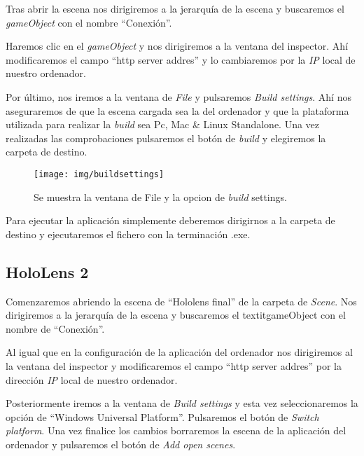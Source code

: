 Tras abrir la escena nos dirigiremos a la jerarquía de la escena y buscaremos el \textit{gameObject} con el nombre “Conexión”.


Haremos clic en el \textit{gameObject} y nos dirigiremos a la ventana del inspector. Ahí modificaremos el campo “http server addres” y lo cambiaremos por la \textit{IP} local de nuestro ordenador.


Por último, nos iremos a la ventana de \textit{File} y pulsaremos \textit{Build settings}. Ahí nos aseguraremos de que la escena cargada sea la del ordenador y que la plataforma utilizada para realizar la \textit{build} sea Pc, Mac \& Linux Standalone. Una vez realizadas las comprobaciones pulsaremos el botón de \textit{build} y elegiremos la carpeta de destino.

\begin{figure}
\centering
\texttt{[image: img/buildsettings]}
\caption{Se muestra la ventana de File y la opcion de \textit{build} settings.}
\end{figure}


Para ejecutar la aplicación simplemente deberemos dirigirnos a la carpeta de destino y ejecutaremos el fichero con la terminación .exe.

\subsection{HoloLens 2}

Comenzaremos abriendo la escena de “Hololens final” de la carpeta de \textit{Scene}. Nos dirigiremos a la jerarquía de la escena y buscaremos el textit{gameObject} con el nombre de “Conexión”.


Al igual que en la configuración de la aplicación del ordenador nos dirigiremos al la ventana del inspector y modificaremos el campo “http server addres” por la dirección \textit{IP} local de nuestro ordenador.

Posteriormente iremos a la ventana de \textit{Build settings} y esta vez seleccionaremos la opción de “Windows Universal Platform”. Pulsaremos el botón de \textit{Switch platform}. Una vez finalice los cambios borraremos la escena de la aplicación del ordenador y pulsaremos el botón de \textit{Add open scenes}.

